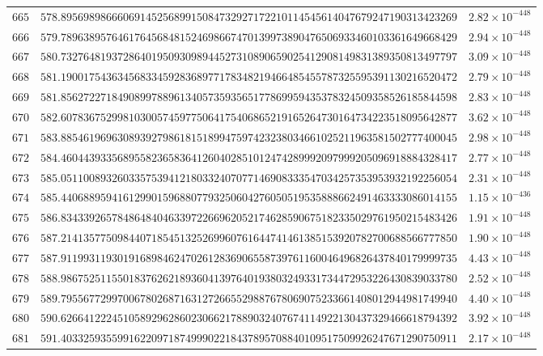 \documentclass[12pt,reqno]{amsart}
\theoremstyle{remark}
\begin{document}
\begin{longtable}{clc}
$665$ & $578.8956989866606914525689915084732927172210114545614047679247190313423269$ & $2.82\times 10^{-448}$ \\
$666$ & $579.7896389576461764568481524698667470139973890476506933460103361649668429$ & $2.94\times 10^{-448}$ \\
$667$ & $580.7327648193728640195093098944527310890659025412908149831389350813497797$ & $3.09\times 10^{-448}$ \\
$668$ & $581.1900175436345683345928368977178348219466485455787325595391130216520472$ & $2.79\times 10^{-448}$ \\
$669$ & $581.8562722718490899788961340573593565177869959435378324509358526185844598$ & $2.83\times 10^{-448}$ \\
$670$ & $582.6078367529981030057459775064175406865219165264730164734223518095642877$ & $3.62\times 10^{-448}$ \\
$671$ & $583.8854619696308939279861815189947597423238034661025211963581502777400045$ & $2.98\times 10^{-448}$ \\
$672$ & $584.4604439335689558236583641260402851012474289992097999205096918884328417$ & $2.77\times 10^{-448}$ \\
$673$ & $585.0511008932603357539412180332407077146908333547034257353953932192256054$ & $2.31\times 10^{-448}$ \\
$674$ & $585.4406889594161299015968807793250604276050519535888662491463333086014155$ & $1.15\times 10^{-436}$ \\
$675$ & $586.8343392657848648404633972266962052174628590675182335029761950215483426$ & $1.91\times 10^{-448}$ \\
$676$ & $587.2141357750984407185451325269960761644741461385153920782700688566777850$ & $1.90\times 10^{-448}$ \\
$677$ & $587.9119931193019168984624702612836906558739761160046496826437840179999735$ & $4.43\times 10^{-448}$ \\
$678$ & $588.9867525115501837626218936041397640193803249331734472953226430839033780$ & $2.52\times 10^{-448}$ \\
$679$ & $589.7955677299700678026871631272665529887678069075233661408012944981749940$ & $4.40\times 10^{-448}$ \\
$680$ & $590.6266412224510589296286023066217889032407674114922130437329466618794392$ & $3.92\times 10^{-448}$ \\
$681$ & $591.4033259355991622097187499902218437895708840109517509926247671290750911$ & $2.17\times 10^{-448}$ \\

\end{longtable}
\end{document}
